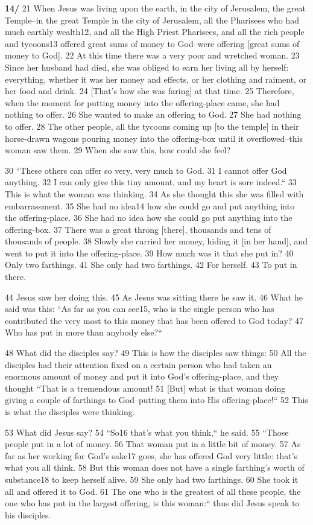 \textbf{14/}  21 When Jesus was living upon the earth, in the city of Jerusalem,
the great Temple--in the great Temple in the city of Jerusalem, all the Pharisees
who had much earthly wealth12, and all the High Priest Pharisees, and all the rich
people and tycoons13 offered great sums of money to God--were offering [great sums
of money to God]. 22 At this time there was a very poor and wretched woman. 23
Since her husband had died, she was obliged to earn her living all by herself:
everything, whether it was her money and effects, or her clothing and raiment,
or her food and drink. 24 [That's how she was faring] at that time. 25 Therefore,
when the moment for putting money into the offering-place came, she had nothing
to offer. 26 She wanted to make an offering to God. 27 She had nothing to offer.
28 The other people, all the tycoons coming up [to the temple] in their horse-drawn
wagons pouring money into the offering-box until it overflowed--this woman saw
them. 29 When she saw this, how could she feel?

30 ``These others can offer so very, very much to God. 31 I cannot offer
God anything. 32 I can only give this tiny amount, and my heart is sore indeed.``
33 This is what the woman was thinking. 34 As she thought this she was filled with
embarrassment. 35 She had no idea14 how she could go and put anything into the
offering-place. 36 She had no idea how she could go put anything into the offering-box.
37 There was a great throng [there], thousands and tens of thousands of people.
38 Slowly she carried her money, hiding it [in her hand], and went to put it into
the offering-place. 39 How much was it that she put in? 40 Only two farthings.
41 She only had two farthings. 42 For herself. 43 To put in there.

44 Jesus saw her doing this. 45 As Jesus was sitting there he saw it. 46 What he
said was this: ``As far as you can see15, who is the single person who
has contributed the very most to this money that has been offered to God today?
47 Who has put in more than anybody else?``

48 What did the disciples say? 49 This is how the disciples saw things: 50 All
the disciples had their attention fixed on a certain person who had taken an enormous
amount of money and put it into God's offering-place, and they thought ``That
is a tremendous amount! 51 [But] what is that woman doing giving a couple of farthings
to God--putting them into His offering-place!`` 52 This is what the disciples
were thinking.

53 What did Jesus say? 54 ``So16 that's what you think,`` he said.
55 ``Those people put in a lot of money. 56 That woman put in a little
bit of money. 57 As far as her working for God's sake17 goes, she has offered God
very little: that's what you all think. 58 But this woman does not have a single
farthing's worth of substance18 to keep herself alive. 59 She only had two farthings.
60 She took it all and offered it to God. 61 The one who is the greatest of all
these people, the one who has put in the largest offering, is this woman:``
thus did Jesus speak to his disciples.

